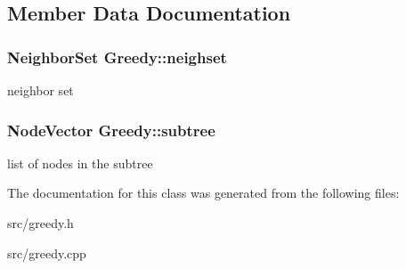 \subsection{Member Data Documentation}
\hypertarget{classGreedy_a56a5f478b16b0da1304d79d03d390ab0}{
\subsubsection[{neighset}]{\setlength{\rightskip}{0pt plus 5cm}NeighborSet {\bf Greedy::neighset}}}
\label{classGreedy_a56a5f478b16b0da1304d79d03d390ab0}
neighbor set \hypertarget{classGreedy_ac7f2cff520d775503d290e236fce8baf}{
\subsubsection[{subtree}]{\setlength{\rightskip}{0pt plus 5cm}NodeVector {\bf Greedy::subtree}}}
\label{classGreedy_ac7f2cff520d775503d290e236fce8baf}
list of nodes in the subtree 

The documentation for this class was generated from the following files:\begin{DoxyCompactItemize}
\item 
src/greedy.h\item 
src/greedy.cpp\end{DoxyCompactItemize}
